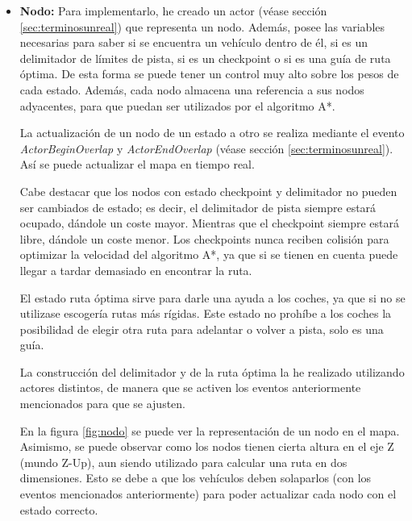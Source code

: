 \begin{itemize}
    \item \textbf{Nodo: }Para implementarlo, he creado un actor (véase sección \ref{sec:terminosunreal}) que representa un nodo. Además, posee las variables necesarias para saber si se encuentra un vehículo dentro de él, si es un delimitador de límites de pista, si es un checkpoint o si es una guía de ruta óptima. De esta forma se puede tener un control muy alto sobre los pesos de cada estado. Además, cada nodo almacena una referencia a sus nodos adyacentes, para que puedan ser utilizados por el algoritmo A*.
    
    \bigskip
    
    La actualización de un nodo de un estado a otro se realiza mediante el evento \textit{ActorBeginOverlap} y \textit{ActorEndOverlap} (véase sección \ref{sec:terminosunreal}). Así se puede actualizar el mapa en tiempo real.
    
    \bigskip
    
    Cabe destacar que los nodos con estado checkpoint y delimitador no pueden ser cambiados de estado; es decir, el delimitador de pista siempre estará ocupado, dándole un coste mayor. Mientras que el checkpoint siempre estará libre, dándole un coste menor. Los checkpoints nunca reciben colisión para optimizar la velocidad del algoritmo A*, ya que si se tienen en cuenta puede llegar a tardar demasiado en encontrar la ruta.
    
    \bigskip
    
    El estado ruta óptima sirve para darle una ayuda a los coches, ya que si no se utilizase escogería rutas más rígidas. Este estado no prohíbe a los coches la posibilidad de elegir otra ruta para adelantar o volver a pista, solo es una guía.
    
    \bigskip
    
    La construcción del delimitador y de la ruta óptima la he realizado utilizando actores distintos, de manera que se activen los eventos anteriormente mencionados para que se ajusten.

    \bigskip

    En la figura \ref{fig:nodo} se puede ver la representación de un nodo en el mapa. Asimismo, se puede observar como los nodos tienen cierta altura en el eje Z (mundo Z-Up), aun siendo utilizado para calcular una ruta en dos dimensiones. Esto se debe a que los vehículos deben solaparlos (con los eventos mencionados anteriormente) para poder actualizar cada nodo con el estado correcto.


\end{itemize}
